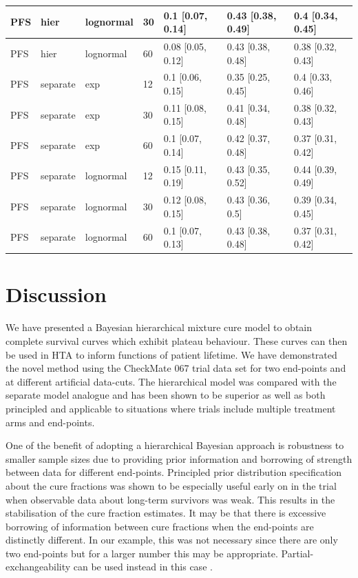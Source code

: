 \documentclass[AMA,STIX1COL]{WileyNJD-v2}
\begin{document}
\begin{table}[!ht]
\begin{tabular}{l|l|l|l|l|l|l}
\hline
PFS & hier & lognormal & 30 & 0.1 [0.07, 0.14] & 0.43 [0.38, 0.49] & 0.4 [0.34, 0.45]\\
\hline
PFS & hier & lognormal & 60 & 0.08 [0.05, 0.12] & 0.43 [0.38, 0.48] & 0.38 [0.32, 0.43]\\
\hline
PFS & separate & exp & 12 & 0.1 [0.06, 0.15] & 0.35 [0.25, 0.45] & 0.4 [0.33, 0.46]\\
\hline
PFS & separate & exp & 30 & 0.11 [0.08, 0.15] & 0.41 [0.34, 0.48] & 0.38 [0.32, 0.43]\\
\hline
PFS & separate & exp & 60 & 0.1 [0.07, 0.14] & 0.42 [0.37, 0.48] & 0.37 [0.31, 0.42]\\
\hline
PFS & separate & lognormal & 12 & 0.15 [0.11, 0.19] & 0.43 [0.35, 0.52] & 0.44 [0.39, 0.49]\\
\hline
PFS & separate & lognormal & 30 & 0.12 [0.08, 0.15] & 0.43 [0.36, 0.5] & 0.39 [0.34, 0.45]\\
\hline
PFS & separate & lognormal & 60 & 0.1 [0.07, 0.13] & 0.43 [0.38, 0.48] & 0.37 [0.31, 0.42]\\
\hline
\end{tabular}
\end{table}

%
\section{Discussion}\label{sec:discussion}
We have presented a Bayesian hierarchical mixture cure model to obtain complete survival curves which exhibit plateau behaviour. These curves can then be used in HTA to inform functions of patient lifetime.
We have demonstrated the novel method using the CheckMate 067 trial data set for two end-points and at different artificial data-cuts.
The hierarchical model was compared with the separate model analogue and has been shown to be superior as well as both principled and applicable to situations where trials include multiple treatment arms and end-points.

One of the benefit of adopting a hierarchical Bayesian approach is robustness to smaller sample sizes due to providing prior information and borrowing of strength between data for different end-points.
Principled prior distribution specification about the cure fractions was shown to be especially useful early on in the trial when observable data about long-term survivors was weak. 
This results in the stabilisation of the cure fraction estimates.
It may be that there is excessive borrowing of information between cure fractions when the end-points are distinctly different.
In our example, this was not necessary since there are only two end-points but for a larger number this may be appropriate.
Partial-exchangeability can be used instead in this case \cite{Neuenschwander2016}.
\end{document}
